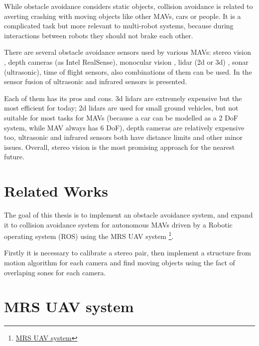 While obstacle avoidance considers static objects, collision avoidance is related to averting crashing with moving objects like other MAVs, cars or people. It is a complicated task but more relevant to multi-robot systems, because during interactions between robots they should not brake each other.

There are several obstacle avoidance sensors used by various MAVs: stereo vision \cite{arxiv}, depth cameras (as Intel RealSense), monocular vision \cite{Mejias2010}, lidar (2d or 3d) \cite{Ramasamy2016}, sonar (ultrasonic), time of flight sensors, also combinations of them can be used. In \cite{Rambabu2015} the sensor fusion of ultrasonic and infrared sensors is presented.

Each of them has its pros and cons. 3d lidars are extremely expensive but the most efficient for today; 2d lidars are used for small ground vehicles, but not suitable for most tasks for MAVs (because a car can be modelled as a 2 DoF system, while MAV always has 6 DoF), depth cameras are relatively expensive too, ultrasonic and infrared sensors both have distance limits and other minor issues. Overall, stereo vision is the most promising approach for the nearest future.

\section{Related Works}

The goal of this thesis is to implement an obstacle avoidance system, and expand it to collision avoidance system for autonomous MAVs driven by a Robotic operating system (ROS) using the MRS UAV system \footnote{\href{https://github.com/ctu-mrs/mrs_uav_system}{MRS UAV system}}. 

Firstly it is necessary to calibrate a stereo pair, then implement a structure from motion algorithm for each camera and find moving objects using the fact of overlaping sones for each camera.


\section{MRS UAV system}
